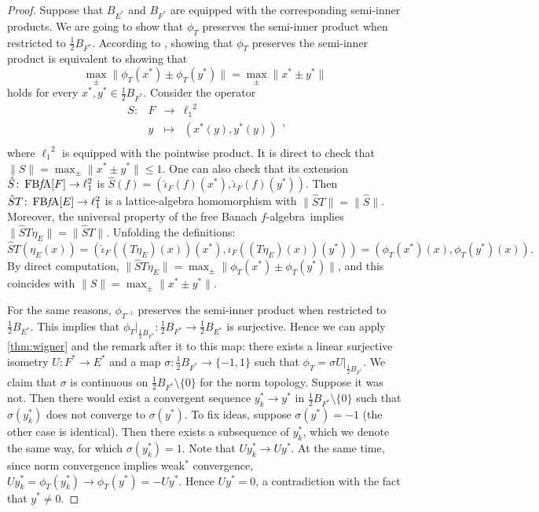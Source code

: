 \documentclass{memo-l}
\theoremstyle{definition}
\theoremstyle{remark}
\numberwithin{section}{chapter}
\numberwithin{equation}{chapter}
\newcommand{\el}[1]{\ensuremath{\ell_{#1}}}
\newcommand{\falg}{$f\!$-algebra}
\newcommand{\FBFA}[1]{\operatorname{FB{\it f}\!A}[#1]}
\begin{document}
\begin{proof}
    Suppose that $B_{E^{*}}$ and $B_{F^{*}}$ are equipped with the
    corresponding semi-inner products. We are going to show that $\phi
    _T$ preserves the semi-inner product when restricted to
    $\frac{1}{2}B_{F^{*}}$. According to \cite[Lemma
    10.19]{oikhberg_etal2022}, showing that $\phi _T$ preserves the
    semi-inner product is equivalent to showing that
    \[
    \max_{\pm} \|\phi_T (x^{*})\pm \phi_T (y^{*})\|=\max_{\pm } \|x^{*}\pm
    y^{*}\|
    \]
    holds for every $x^{*}, y^{*} \in \frac{1}{2}B_{F^{*}}$. Consider the
    operator
    \[
    \begin{array}{cccc}
    S\colon& F & \longrightarrow & \el 1^{2} \\
            & y & \longmapsto & (x^{*}(y),y^{*}(y)) \\
    \end{array},
    \]
    where $\el 1^2$ is equipped with the pointwise product.
    It is direct to check that $\|S\|=\max_{\pm }\|x^{*}\pm y^{*}\|\le 1$.
    One can also check that its extension $\hat{S}\colon \FBFA F\to
    \el 1^2$ is $\hat{S}(f)=(\hat{\iota
    }_F(f)(x^{*}),\hat{\iota }_F(f)(y^{*}))$. Then $\hat{S}T\colon
    \FBFA E\to \el 1^2$ is a lattice-algebra homomorphism with
    $\|\hat{S}T\|=\|\hat{S}\|$. Moreover, the universal property
    of the free Banach \falg\ implies $\|\hat{S}T\eta
    _E\|=\|\hat{S}T\|$. Unfolding the definitions:
    \[
    \hat{S}T(\eta _E(x))=(\hat{\iota }_F((T\eta
    _E)(x))(x^{*}),\hat{\iota }_F((T\eta
    _E)(x))(y^{*}))=(\phi _T(x^{*})(x),\phi _T(y^{*})(x)).
    \]
    By direct computation, $\|\hat{S}T\eta _E\|=\max_{\pm }\|\phi
    _T(x^{*})\pm \phi _T(y^{*})\|$, and this coincides with
    $\|S\|=\max_{\pm}\|x^{*}\pm y^{*}\|$.

    For the same reasons, $\phi _{T^{-1}}$ preserves the semi-inner
    product when restricted to $\frac{1}{2}B_{E^{*}}$. This implies
    that
    $\phi _T|_{\frac{1}{2}B_{F^{*}}}\colon \frac{1}{2}B_{F^{*}}\to
    \frac{1}{2}B_{E^{*}}$ is surjective.
    Hence we can apply \cref{thm:wigner} and the remark after it to
    this map: there exists a linear surjective isometry
    $U\colon F^{*}\to E^{*}$ and a map $\sigma \colon \frac{1}{2}B_{F^{*}}\to
    \{-1,1\}$ such that $\phi _T=\sigma U|_{\frac{1}{2}B_{F^{*}}}$. We claim that
    $\sigma $ is continuous on $\frac{1}{2}B_{F^{*}}\setminus \{0\}$ for the norm
    topology. Suppose it was not. Then there would exist a convergent
    sequence $y_k^{*}\to y^{*}$ in $\frac{1}{2}B_{F^{*}}\setminus \{0\}$ such
    that $\sigma (y_k^{*})$ does not converge to $\sigma (y^{*})$.
    To fix ideas, suppose $\sigma (y^{*})=-1$ (the other case is
    identical). Then there exists a subsequence of $y_k^{*}$, which we
    denote the same way, for which $\sigma (y_k^{*})=1$. Note that
    $Uy_k^{*}\to Uy^{*}$. At the same time, since norm convergence
    implies weak$^*$ convergence, $Uy_k^{*}=\phi _T(y_k^{*})\to \phi
    _T(y^{*})=-Uy^{*}$. Hence $Uy^{*}=0$, a contradiction with the
    fact that $y^{*}\neq 0$.


\end{proof}
\end{document}
